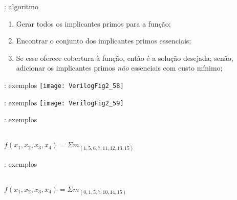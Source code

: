 \begin{frame}{\insertsection: algoritmo}
    \begin{enumerate}
        \item Gerar todos os implicantes primos para a função;
        \item Encontrar o conjunto dos implicantes primos essenciais;
        \item Se esse oferece cobertura à função, então é a solução desejada; senão, adicionar os implicantes primos \textit{não} essenciais com custo mínimo;
    \end{enumerate}
\end{frame}

\begin{frame}{\insertsection: exemplos}
    \centering
    \texttt{[image: VerilogFig2\_58]}
\end{frame}

\begin{frame}{\insertsection: exemplos}
    \centering
    \texttt{[image: VerilogFig2\_59]}
\end{frame}

\begin{frame}{\insertsection: exemplos}
    \centering 
    \begin{karnaugh-map}[4][4][1][$x_3x_4$][$x_1x_2$]
      \autoterms[0]
    \end{karnaugh-map} \\
    $f(x_1, x_2, x_3, x_4) = \Sigma m_{(1,5,6,7,11,12,13,15)}$ \\
\end{frame}

\begin{frame}{\insertsection: exemplos}
    \centering 
    \begin{karnaugh-map}[4][4][1][$x_3x_4$][$x_1x_2$]
      \autoterms[0]
    \end{karnaugh-map} \\
    $f(x_1, x_2, x_3, x_4) = \Sigma m_{(0,1,5,7,10,14,15)}$ \\
\end{frame}

